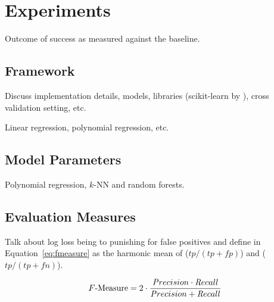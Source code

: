 \section{Experiments}
\label{sec:three}

Outcome of success as measured against the baseline.

\subsection{Framework}

Discuss implementation details, models, libraries (scikit-learn by
\citet{sklearn:2011}), cross validation setting, etc.

Linear regression, polynomial regression, etc.

\subsection{Model Parameters}

Polynomial regression, $k$-NN and random forests.

\subsection{Evaluation Measures}

Talk about log loss being to punishing for false positives and define
\fmeasure{} in Equation~\ref{eq:fmeasure} as the harmonic mean of \precision{}
($tp / (tp + fp)$) and \recall{} ($tp / (tp + fn)$).

\begin{equation}\label{eq:fmeasure}
  \text{\ensuremath{F}-Measure} = 2 \cdot \frac{{\mathop{\mathit Precision}} \cdot {\mathop{\mathit Recall}}} {{\mathop{\mathit Precision}} +
    {\mathop{\mathit Recall}}}
\end{equation}\vspace{-5pt}


